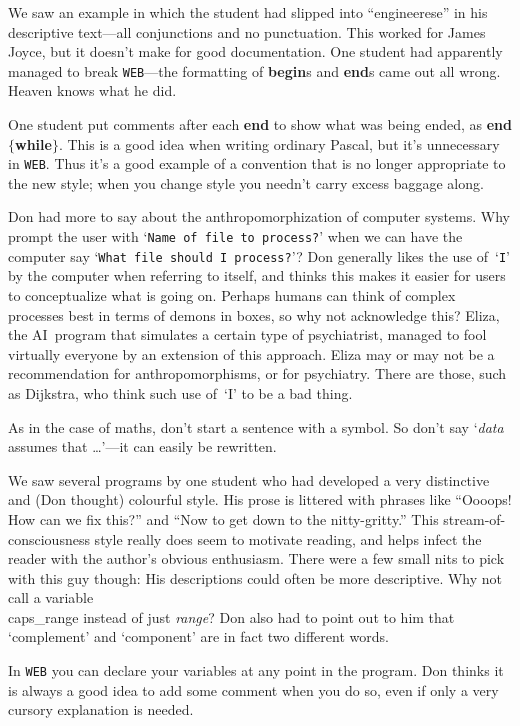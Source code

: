 We saw an example in which the student had slipped into ``engineerese''
in his descriptive text---all conjunctions and no punctuation. This
worked for James Joyce, but it doesn't make for good documentation.
One student had apparently managed to break {\tt WEB}---the formatting of
{\bf begin}s and {\bf end}s came out all wrong. Heaven knows what he did.

One student put comments after each {\bf end} to show what was being
ended, as {\bf end} $\{${\bf while}$\}$. This is a good idea when writing
ordinary Pascal, but it's unnecessary in {\tt WEB}. 
Thus it's a good example of a convention
that is no longer appropriate to the new style; when you change
style you needn't carry excess baggage along.

Don had more to say about the anthropomorphization of computer
systems.  Why prompt the user with `{\tt Name of file to process?}' when we
can have the computer say `{\tt What file should I process?}'? Don
generally likes the use of~`{\tt I}' by the computer when referring to
itself, and thinks this makes it easier for users to conceptualize
what is going on. Perhaps humans can think of complex processes best in
terms of demons in boxes, so why not acknowledge this? Eliza, the AI~program
 that simulates a certain type of psychiatrist, managed to fool
virtually everyone by an extension of this approach. Eliza may or may
not be a recommendation for anthropomorphisms, or for psychiatry. There are
those, such as Dijkstra, who think such use of~`I' to be a bad thing.

As in the case of maths, don't start a sentence with a symbol. So
don't say `{\it data\/} assumes that \dots'---it can easily
be rewritten.

We saw several programs by one student who had developed a very
distinctive and (Don thought) colourful style. His prose is littered
with phrases like ``Oooops! How can we fix this?'' and ``Now to get down
to the nitty-gritty.''  This  stream-of-consciousness style really
does seem to motivate reading, and helps infect the reader with the
author's obvious enthusiasm. There were a few small nits to pick with
this guy though: His descriptions could often be more descriptive.
Why not call a variable \\{caps\_range} instead of just {\it range\/}? Don also
had to point out to him that `complement' and `component' are in fact
two different words.

  In {\tt WEB} you can declare your variables at any point in the program.
Don thinks it is always a good idea to add some comment when you do
so, even if only a very cursory explanation is needed.

